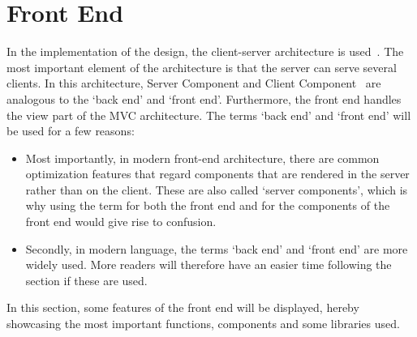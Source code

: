\section{Front End}\label{sec:front-end}

In the implementation of the design, the client-server architecture is used~\cite{mathiassen2018}.
The most important element of the architecture is that the server can serve several clients.
In this architecture, Server Component and Client Component~\cite{mathiassen2018} are analogous to the `back end' and
`front end'.
Furthermore, the front end handles the view part of the MVC architecture.
The terms `back end' and `front end' will be used for a few reasons:

\begin{itemize}
    \item Most importantly, in modern front-end architecture, there are common optimization features that regard
    components that are rendered in the server rather than on the client.
    These are also called `server components', which is why using the term for both the front end and for the
    components of the front end would give rise to confusion.

    \item Secondly, in modern language, the terms `back end' and `front end' are more widely used.
    More readers will therefore have an easier time following the section if these are used.
\end{itemize}

In this section, some features of the front end will be displayed, hereby showcasing the most important functions,
components and some libraries used.





